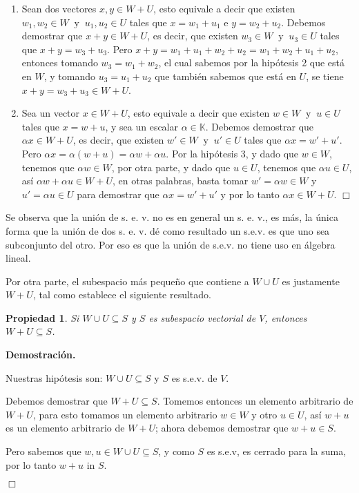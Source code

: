 \documentclass[12pt]{book}
\newtheorem{prop}{Propiedad}
\def\K{\mathbb{K}}
\begin{document}
\begin{itemize}
\begin{enumerate}
\item Sean dos vectores $ x,y \in W+ U$, esto equivale a decir que existen $w_1,w_2\in W\ \textrm{ y }\ u_1,u_2\in U$ tales que $x=w_1+u_1$ e $y=w_2+u_2$.
Debemos demostrar que $x+y\in W+ U$, es decir, que existen $w_3\in W\ \textrm{ y }\ u_3\in U$ tales que $x+y=w_3+u_3$.
Pero $x+y=w_1+u_1+w_2+u_2=w_1+w_2+u_1+u_2$, entonces tomando $w_3=w_1+w_2$, el cual sabemos por la hipótesis 2 que está en $W$, y tomando $u_3=u_1+u_2$ que también sabemos que está en $U$, se tiene $x+y=w_3+u_3\in W+ U$.
\item Sea un vector $ x \in W+ U$, esto equivale a decir que existen  $w\in W\ \textrm{ y }\ u\in U$ tales que $x=w+u$, y sea un escalar $\alpha\in\K$.
Debemos demostrar que $\alpha x\in W+ U$, es decir,  que existen $w'\in W\ \textrm{ y }\ u'\in U$ tales que $\alpha x=w'+u'$.
Pero $\alpha x=\alpha (w+u)=\alpha w+\alpha u$.
Por la hipótesis 3, y dado que $w\in W$, tenemos que $\alpha w\in W$, por otra parte, y dado que $u\in U$, tenemos que $\alpha u\in U$, así $\alpha w+\alpha u\in W+ U$, en otras palabras, basta tomar $w'=\alpha w\in W$ y $u'=\alpha u\in U$ para demostrar que $\alpha x=w'+u'$ y por lo tanto $\alpha x\in W+U$. \hfill $\Box$
\end{enumerate}
\end{itemize}


Se observa que la uni\'on de s. e. v. no es en general un s. e. v., es m\'as, la \'unica forma que la uni\'on de dos s. e. v. d\'e como resultado un s.e.v. es que uno sea subconjunto del otro.
Por eso es que la unión de s.e.v. no tiene uso en álgebra lineal.

Por otra parte, el subespacio más pequeño que contiene a $W\cup U$ es justamente $W+U$, tal como establece el siguiente resultado.

\begin{prop}
Si $W\cup U\subseteq S$ y $S$ es subespacio vectorial de $V$, entonces $W+U\subseteq S$.
\end{prop}
    {\bf Demostración.}
    {
      Nuestras hipótesis son: $W\cup U\subseteq S$ y $S$ es s.e.v. de $V$.

      Debemos demostrar que $W+U\subseteq S$.
      Tomemos entonces un elemento arbitrario de $W+U$, para esto tomamos un elemento arbitrario $w\in W$ y otro $u\in U$, así $w+u$ es un elemento arbitrario de $W+U$; ahora debemos demostrar que $w+u\in S$.

      Pero sabemos que $w,u\in W\cup U\subseteq S$, y como $S$ es s.e.v, es cerrado para la suma, por lo tanto $w+u$ in $S$.
    }\hfill $\Box$
\end{document}
